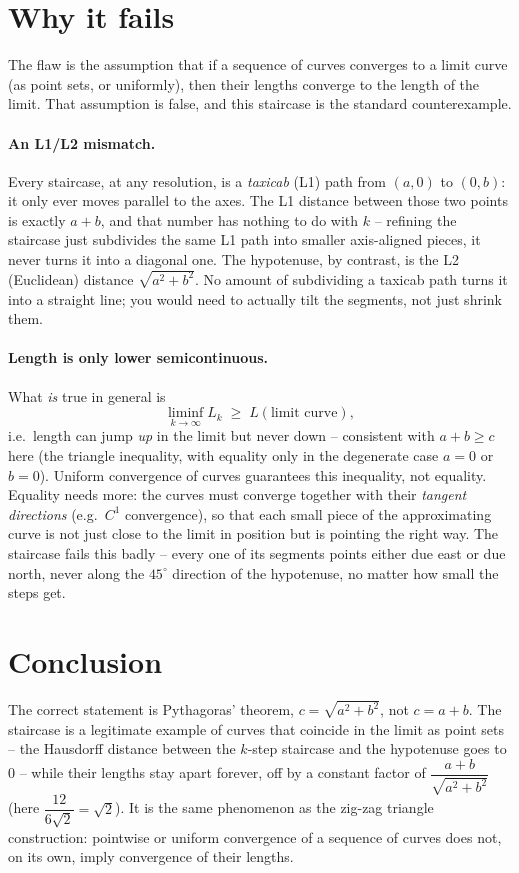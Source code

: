 \documentclass[11pt]{article}
\begin{document}
\section{Why it fails}

The flaw is the assumption that if a sequence of curves converges to a limit
curve (as point sets, or uniformly), then their lengths converge to the
length of the limit. That assumption is false, and this staircase is the
standard counterexample.

\paragraph{An L1/L2 mismatch.} Every staircase, at any resolution, is a
\emph{taxicab} (L1) path from $(a,0)$ to $(0,b)$: it only ever moves parallel
to the axes. The L1 distance between those two points is exactly $a+b$, and
that number has nothing to do with $k$ -- refining the staircase just
subdivides the same L1 path into smaller axis-aligned pieces, it never turns
it into a diagonal one. The hypotenuse, by contrast, is the L2 (Euclidean)
distance $\sqrt{a^2+b^2}$. No amount of subdividing a taxicab path turns it
into a straight line; you would need to actually tilt the segments, not just
shrink them.

\paragraph{Length is only lower semicontinuous.} What \emph{is} true in
general is
$$\liminf_{k\to\infty} L_k \;\ge\; L(\text{limit curve}),$$
i.e.\ length can jump \emph{up} in the limit but never down -- consistent with
$a+b \ge c$ here (the triangle inequality, with equality only in the
degenerate case $a=0$ or $b=0$). Uniform convergence of curves guarantees
this inequality, not equality. Equality needs more: the curves must converge
together with their \emph{tangent directions} (e.g.\ $C^1$ convergence), so
that each small piece of the approximating curve is not just close to the
limit in position but is pointing the right way. The staircase fails this
badly -- every one of its segments points either due east or due north, never
along the $45^\circ$ direction of the hypotenuse, no matter how small the
steps get.

\section{Conclusion}

The correct statement is Pythagoras' theorem, $c=\sqrt{a^2+b^2}$, not
$c=a+b$. The staircase is a legitimate example of curves that coincide in the
limit as point sets -- the Hausdorff distance between the $k$-step staircase
and the hypotenuse goes to $0$ -- while their lengths stay apart forever,
off by a constant factor of $\dfrac{a+b}{\sqrt{a^2+b^2}}$ (here
$\dfrac{12}{6\sqrt2}=\sqrt2$). It is the same phenomenon as the zig-zag
triangle construction: pointwise or uniform convergence of a sequence of
curves does not, on its own, imply convergence of their lengths.
\end{document}
